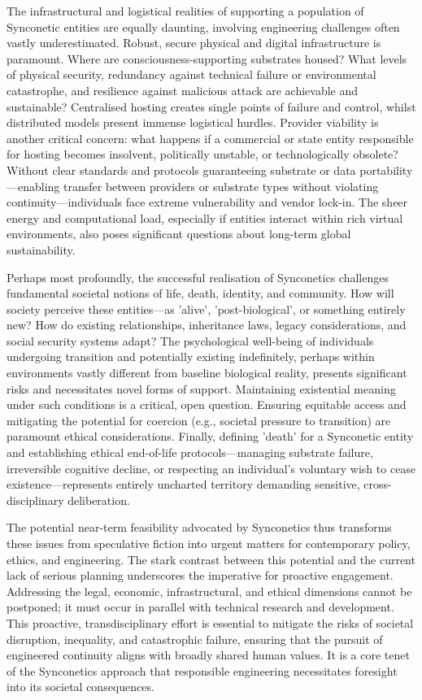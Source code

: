 \documentclass[10pt]{article}
\begin{document}
\begin{sloppypar}
  The infrastructural and logistical realities of supporting a population of Synconetic entities are equally daunting, involving engineering challenges often vastly underestimated. Robust, secure physical and digital infrastructure is paramount. Where are consciousness-supporting substrates housed? What levels of physical security, redundancy against technical failure or environmental catastrophe, and resilience against malicious attack are achievable and sustainable? Centralised hosting creates single points of failure and control, whilst distributed models present immense logistical hurdles. Provider viability is another critical concern: what happens if a commercial or state entity responsible for hosting becomes insolvent, politically unstable, or technologically obsolete? Without clear standards and protocols guaranteeing substrate or data portability—enabling transfer between providers or substrate types without violating continuity—individuals face extreme vulnerability and vendor lock-in. The sheer energy and computational load, especially if entities interact within rich virtual environments, also poses significant questions about long-term global sustainability.

  Perhaps most profoundly, the successful realisation of Synconetics challenges fundamental societal notions of life, death, identity, and community. How will society perceive these entities—as 'alive', 'post-biological', or something entirely new? How do existing relationships, inheritance laws, legacy considerations, and social security systems adapt? The psychological well-being of individuals undergoing transition and potentially existing indefinitely, perhaps within environments vastly different from baseline biological reality, presents significant risks and necessitates novel forms of support. Maintaining existential meaning under such conditions is a critical, open question. Ensuring equitable access and mitigating the potential for coercion (e.g., societal pressure to transition) are paramount ethical considerations. Finally, defining 'death' for a Synconetic entity and establishing ethical end-of-life protocols—managing substrate failure, irreversible cognitive decline, or respecting an individual's voluntary wish to cease existence—represents entirely uncharted territory demanding sensitive, cross-disciplinary deliberation.

  The potential near-term feasibility advocated by Synconetics thus transforms these issues from speculative fiction into urgent matters for contemporary policy, ethics, and engineering. The stark contrast between this potential and the current lack of serious planning underscores the imperative for proactive engagement. Addressing the legal, economic, infrastructural, and ethical dimensions cannot be postponed; it must occur in parallel with technical research and development. This proactive, transdisciplinary effort is essential to mitigate the risks of societal disruption, inequality, and catastrophic failure, ensuring that the pursuit of engineered continuity aligns with broadly shared human values. It is a core tenet of the Synconetics approach that responsible engineering necessitates foresight into its societal consequences.


\end{sloppypar}
\end{document}
